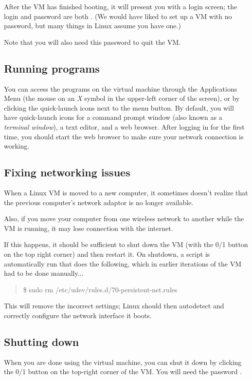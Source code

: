 \documentclass[letterpaper,10pt,english]{sphinxmanual}
\begin{document}
After the VM has finished booting, it will present you with a login
screen; the login and password are both .  (We would have
liked to set up a VM with no password, but many things in Linux assume
you have one.)

Note that you will also need this password to quit the VM.


\subsection{Running programs}
\label{vm:running-programs}
You can access the programs on the virtual machine through the Applications
Menu (the mouse on an \emph{X} symbol in the upper-left corner of the
screen), or by clicking the quick-launch icons next to the menu
button.  By default, you will have quick-launch icons for a command
prompt window (also known as a \emph{terminal window}), a text editor, and
a web browser.  After logging in for the first time, you should start
the web browser to make sure your network connection is working.


\subsection{Fixing networking issues}
\label{vm:fixing-networking-issues}
When a Linux VM is moved to a new computer, it sometimes doesn't
realize that the previous computer's network adaptor is no longer
available.

Also, if you move your computer from one wireless network to another while
the VM is running, it may lose connection with the internet.

If this happens, it should be sufficient to shut down the VM (with the 0/1
button on the top right corner) and then restart it.
On shutdown, a script is automatically run that does the following, which in
earlier iterations of the VM had to be done manually...
\begin{quote}

\$ sudo rm /etc/udev/rules.d/70-persistent-net.rules
\end{quote}

This will remove the incorrect settings; Linux should then autodetect
and correctly configure the network interface it boots.


\subsection{Shutting down}
\label{vm:shutting-down}
When you are done using the virtual machine, you can shut it down by
clicking the 0/1 button on the top-right corner of the VM.
You will need the password .
\end{document}
